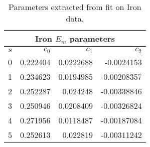 \begin{table}[!ht]
\centering
\begin{tabular}{|r|r|r|r|}
\multicolumn{4}{c}{Iron $E_{m}$ parameters} \\ \hline
$s$ &$c_0$ & $c_1$ & $c_2$\\ \hline
0 & 0.222404 & 0.0222688 & -0.0024153\\ \hline
1 & 0.234623 & 0.0194985 & -0.00208357\\ \hline
2 & 0.252287 & 0.024248 & -0.00338846\\ \hline
3 & 0.250946 & 0.0208409 & -0.00326824\\ \hline
4 & 0.271956 & 0.0118487 & -0.00187084\\ \hline
5 & 0.252613 & 0.022819 & -0.00311242 \\ \hline
\end{tabular}
\caption{Parameters extracted from fit on Iron data. \cite{Taya_thesis}}
\label{tb:sf_Fe_m}
\end{table}

